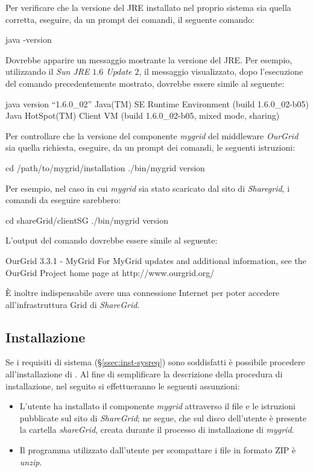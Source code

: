 Per verificare che la versione del JRE installato nel proprio sistema sia quella corretta, eseguire, da un prompt dei comandi, il seguente comando:
\begin{mgCodeBox}
java -version
\end{mgCodeBox}
Dovrebbe apparire un messaggio mostrante la versione del JRE.
Per esempio, utilizzando il \emph{Sun JRE $1.6$ Update $2$}, il messaggio visualizzato, dopo l'esecuzione del comando precedentemente mostrato, dovrebbe essere simile al seguente:
\begin{mgCodeBox}
java version ``1.6.0\_02''\newline
Java(TM) SE Runtime Environment (build 1.6.0\_02-b05)\newline
Java HotSpot(TM) Client VM (build 1.6.0\_02-b05, mixed mode, sharing)
\end{mgCodeBox}

Per controllare che la versione del componente \emph{mygrid} del middleware \emph{OurGrid} sia quella richiesta, eseguire, da un prompt dei comandi, le seguenti istruzioni:
\begin{mgCodeBox}
cd /path/to/mygrid/installation\newline
./bin/mygrid version
\end{mgCodeBox}
Per esempio, nel caso in cui \emph{mygrid} sia stato scaricato dal sito di \emph{Sharegrid}, i comandi da eseguire sarebbero:
\begin{mgCodeBox}
cd shareGrid/clientSG\newline
./bin/mygrid version
\end{mgCodeBox}
L'output del comando dovrebbe essere simile al seguente:
\begin{mgCodeBox}
OurGrid 3.3.1 - MyGrid\newline
\newline
For MyGrid updates and additional information, see the\newline
OurGrid Project home page at http://www.ourgrid.org/ 
\end{mgCodeBox}

\`E inoltre indispensabile avere una connessione Internet per poter accedere all'infrastruttura Grid di \emph{ShareGrid}.

\subsection{Installazione} \label{sec:inst-inst}

Se i requisiti di sistema (\S \ref{ssec:inst-sysreq}) sono soddisfatti \`e possibile procedere all'installazione di \mgTheApp{}.
Al fine di semplificare la descrizione della procedura di installazione, nel seguito si effettueranno le seguenti assunzioni:
\begin{itemize}
\item L'utente ha installato il componente \emph{mygrid} attraverso il file e le istruzioni pubblicate sul sito di \emph{ShareGrid}; ne segue, che sul disco dell'utente \`e presente la cartella \emph{shareGrid}, creata durante il processo di installazione di \emph{mygrid}.
\item Il programma utilizzato dall'utente per scompattare i file in formato ZIP \`e \emph{unzip}.
\end{itemize}

